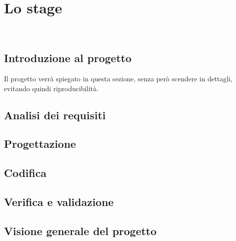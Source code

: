 
\chapter{Lo stage}
\label{cap:descrizione-stage}

\\

\section{Introduzione al progetto}
Il progetto verrà spiegato in questa sezione, senza però scendere in dettagli, evitando quindi riproducibilità.

\section{Analisi dei requisiti}

\section{Progettazione}

\section{Codifica}

\section{Verifica e validazione}

\section{Visione generale del progetto}